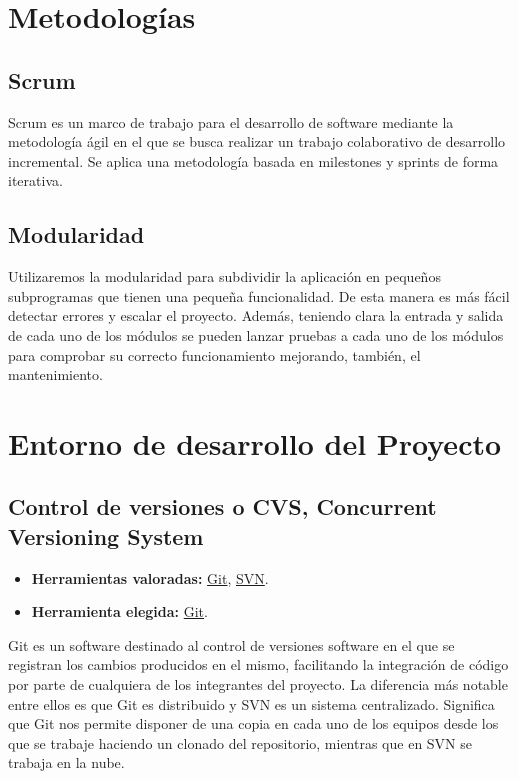 \section{Metodologías}
\subsection{Scrum}
Scrum\cite{manual:Scrum} es un marco de trabajo para el desarrollo de software mediante la metodología ágil en el que se busca realizar un trabajo colaborativo de desarrollo incremental. Se aplica una metodología basada en milestones y sprints de forma iterativa.

\subsection{Modularidad}
Utilizaremos la modularidad para subdividir la aplicación en pequeños subprogramas que tienen una pequeña funcionalidad. De esta manera es más fácil detectar errores y escalar el proyecto. Además, teniendo clara la entrada y salida de cada uno de los módulos se pueden lanzar pruebas a cada uno de los módulos para comprobar su correcto funcionamiento mejorando, también, el mantenimiento.

\section{Entorno de desarrollo del Proyecto}

\subsection{Control de versiones o CVS, Concurrent Versioning System}
\begin{itemize}
    \item \textbf{Herramientas valoradas:} \href{https://git-scm.com/}{Git}, \href{https://subversion.apache.org/}{SVN}.
    \item \textbf{Herramienta elegida:} \href{https://git-scm.com/}{Git}.
\end{itemize}

Git es un software destinado al control de versiones software en el que se registran los cambios producidos en el mismo, facilitando la integración de código por parte de cualquiera de los integrantes del proyecto.
La diferencia más notable entre ellos es que Git es distribuido y SVN es un sistema centralizado. Significa que Git nos permite disponer de una copia en cada uno de los equipos desde los que se trabaje haciendo un clonado del repositorio, mientras que en SVN se trabaja en la nube.

